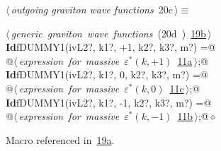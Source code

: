 \documentclass[a4paper,12pt]{amsart}
\renewcommand{\NWtarget}[2]{\hypertarget{#1}{#2}}
\renewcommand{\NWlink}[2]{\hyperlink{#1}{#2}}
\renewcommand{\NWtxtMacroRefIn}{Macro referenced in}
\renewcommand{\NWsep}{${\diamond}$}
\begin{document}
\begin{flushleft} \small
\begin{minipage}{\linewidth}\label{scrap43}\raggedright\small
\NWtarget{nuweb20c}{} $\langle\,${\itshape outgoing graviton wave functions}\nobreak\ {\footnotesize {20c}}$\,\rangle\equiv$
\vspace{-1ex}
\begin{list}{}{} \item
\mbox{}\verb@@\hbox{$\langle\,${\itshape generic graviton wave functions}\nobreak\ ({\footnotesize 20d\label{scrap44}
 }\mbox{}\verb@out@ ) {\footnotesize \NWlink{nuweb19b}{19b}}$\,\rangle$}\verb@@\\
\mbox{}\verb@@\hbox{\sffamily\bfseries Id}\verb@ fDUMMY1(ivL2?, k1?, +1, k2?, k3?, m?) =@\\
\mbox{}\verb@   @\hbox{$\langle\,${\itshape expression for massive $\varepsilon^\ast(k, +1)$}\nobreak\ {\footnotesize \NWlink{nuweb11a}{11a}}$\,\rangle$}\verb@;@\\
\mbox{}\verb@@\hbox{\sffamily\bfseries Id}\verb@ fDUMMY1(ivL2?, k1?, 0, k2?, k3?, m?) =@\\
\mbox{}\verb@   @\hbox{$\langle\,${\itshape expression for massive $\varepsilon^\ast(k, 0)$}\nobreak\ {\footnotesize \NWlink{nuweb11c}{11c}}$\,\rangle$}\verb@;@\\
\mbox{}\verb@@\hbox{\sffamily\bfseries Id}\verb@ fDUMMY1(ivL2?, k1?, -1, k2?, k3?, m?) =@\\
\mbox{}\verb@   @\hbox{$\langle\,${\itshape expression for massive $\varepsilon^\ast(k, -1)$}\nobreak\ {\footnotesize \NWlink{nuweb11b}{11b}}$\,\rangle$}\verb@;@{\NWsep}
\end{list}
\vspace{-1.5ex}
\footnotesize
\begin{list}{}{\setlength{\itemsep}{-\parsep}\setlength{\itemindent}{-\leftmargin}}
\item \NWtxtMacroRefIn\ \NWlink{nuweb19a}{19a}.

\item{}
\end{list}
\end{minipage}\vspace{4ex}
\end{flushleft}
\end{document}

